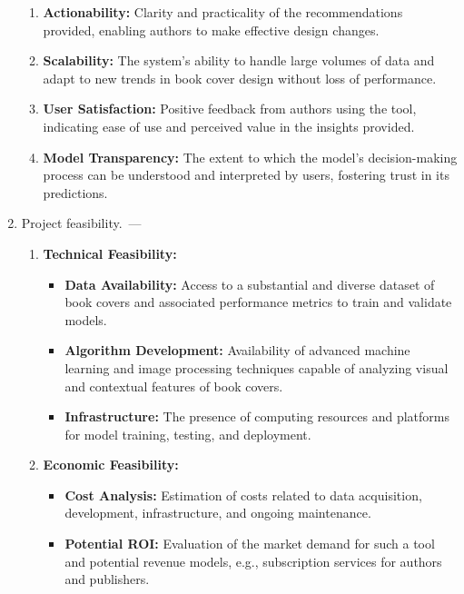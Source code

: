 \documentclass[12pt]{article}
\begin{document}
\begin{enumerate}
\begin{enumerate}
                                 \item \textbf{Actionability:} Clarity and practicality of the recommendations provided, enabling authors to make effective design changes.

                                 \item \textbf{Scalability:} The system's ability to handle large volumes of data and adapt to new trends in book cover design without loss of performance.

                                 \item \textbf{User Satisfaction:} Positive feedback from authors using the tool, indicating ease of use and perceived value in the insights provided.

                                 \item \textbf{Model Transparency:} The extent to which the model's decision-making process can be understood and interpreted by users, fostering trust in its predictions.
\end{enumerate}
\item Project feasibility.~---\begin{enumerate}
                                  \item \textbf{Technical Feasibility:}
                                  \begin{itemize}
                                      \item \textbf{Data Availability:} Access to a substantial and diverse dataset of book covers and associated performance metrics to train and validate models.
                                      \item \textbf{Algorithm Development:} Availability of advanced machine learning and image processing techniques capable of analyzing visual and contextual features of book covers.
                                      \item \textbf{Infrastructure:} The presence of computing resources and platforms for model training, testing, and deployment.
                                  \end{itemize}

                                  \item \textbf{Economic Feasibility:}
                                  \begin{itemize}
                                      \item \textbf{Cost Analysis:} Estimation of costs related to data acquisition, development, infrastructure, and ongoing maintenance.
                                      \item \textbf{Potential ROI:} Evaluation of the market demand for such a tool and potential revenue models, e.g., subscription services for authors and publishers.
                                  \end{itemize}


\end{enumerate}
\end{enumerate}
\end{document}
